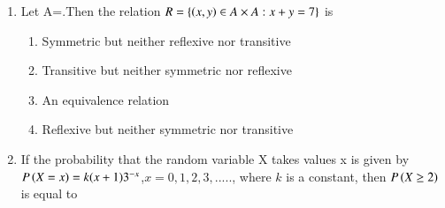 \documentclass[journal]{IEEEtran}
\numberwithin{equation}{enumi}
\numberwithin{figure}{enumi}
\begin{document}
\begin{enumerate}
    \item Let A=.Then the relation $R=\left\{\left(x,y\right) \in A\times A :x+y=7\right\}$ is 
        \hfill{}\\
        \begin{enumerate} 
                \item Symmetric but neither reflexive nor transitive
                \item Transitive but neither symmetric nor reflexive
                \item An equivalence relation
                \item Reflexive but neither symmetric nor transitive
              \end{enumerate}    

    \item If the probability that the random variable X takes values x is given by $P\left(X=x\right)=k(x+1)3^{-x}$,$x=0,1,2,3,.....$, where $k$ is a constant, then $P\left(X\geq 2\right)$ is equal to
    \hfill{}\\
        \begin{enumerate}    
        \end{enumerate}    
\end{enumerate}
\end{document}
